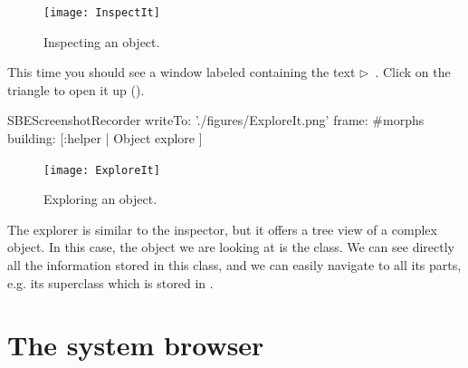 \documentclass[a4paper,10pt,twoside]{book}
\begin{document}
\begin{figure}[htb]
\centerline {\texttt{[image: InspectIt]}}
\caption{Inspecting an object. \label{fig:inspectit}}
\end{figure}



This time you should see a window labeled  containing the text
\mbox{$\triangleright$ }.
Click on the triangle to open it up ().

\begin{ExecuteSmalltalkScript}
SBEScreenshotRecorder writeTo: './figures/ExploreIt.png' frame: #morphs building: [:helper |
  Object explore
]
\end{ExecuteSmalltalkScript}
\begin{figure}[htb]
\centerline {\texttt{[image: ExploreIt]}}
\caption{Exploring an object. \label{fig:exploreit}}
\end{figure}

The explorer is similar to the inspector, but it offers a tree view of a complex object.
In this case, the object we are looking at is the  class.
We can see directly all the information stored in this class, and we can easily navigate to all its parts, e.g. its superclass which is stored in .

\section{The system browser}
\end{document}
